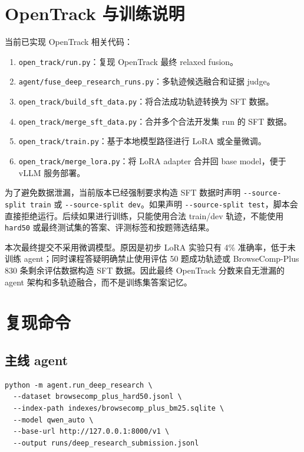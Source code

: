 \documentclass[a4paper]{article}
\begin{document}
\section{OpenTrack 与训练说明}

当前已实现 OpenTrack 相关代码：

\begin{enumerate}
  \item \verb|open_track/run.py|：复现 OpenTrack 最终 relaxed fusion。
  \item \verb|agent/fuse_deep_research_runs.py|：多轨迹候选融合和证据 judge。
  \item \verb|open_track/build_sft_data.py|：将合法成功轨迹转换为 SFT 数据。
  \item \verb|open_track/merge_sft_data.py|：合并多个合法开发集 run 的 SFT 数据。
  \item \verb|open_track/train.py|：基于本地模型路径进行 LoRA 或全量微调。
  \item \verb|open_track/merge_lora.py|：将 LoRA adapter 合并回 base model，便于 vLLM 服务部署。
\end{enumerate}

为了避免数据泄漏，当前版本已经强制要求构造 SFT 数据时声明 \verb|--source-split train| 或 \verb|--source-split dev|。如果声明 \verb|--source-split test|，脚本会直接拒绝运行。后续如果进行训练，只能使用合法 train/dev 轨迹，不能使用 \verb|hard50| 或最终测试集的答案、评测标签和按题筛选结果。

本次最终提交不采用微调模型。原因是初步 LoRA 实验只有 4\% 准确率，低于未训练 agent；同时课程答疑明确禁止使用评估 50 题成功轨迹或 BrowseComp-Plus 830 条剩余评估数据构造 SFT 数据。因此最终 OpenTrack 分数来自无泄漏的 agent 架构和多轨迹融合，而不是训练集答案记忆。

\section{复现命令}

\subsection{主线 agent}

\begin{verbatim}
python -m agent.run_deep_research \
  --dataset browsecomp_plus_hard50.jsonl \
  --index-path indexes/browsecomp_plus_bm25.sqlite \
  --model qwen_auto \
  --base-url http://127.0.0.1:8000/v1 \
  --output runs/deep_research_submission.jsonl
\end{verbatim}
\end{document}
